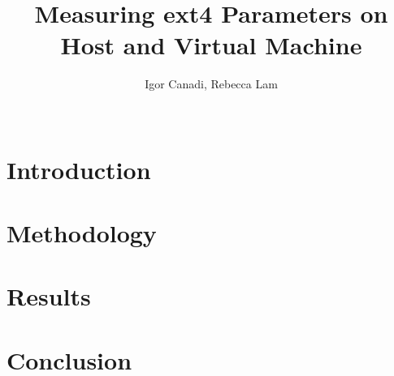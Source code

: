 \documentclass{sig-alternate-10pt}
\begin{document}
\title{Measuring ext4 Parameters on Host and Virtual Machine}

\author{
	\alignauthor Igor Canadi, Rebecca Lam\\
	\\
}

\maketitle

\lstset{
	breaklines=true
}




\section{Introduction}
\label{sec:intro}


\section{Methodology}
\label{sec:method}


\section{Results}
\label{sec:results}


\section{Conclusion}
\label{sec:conc}

\end{document}
